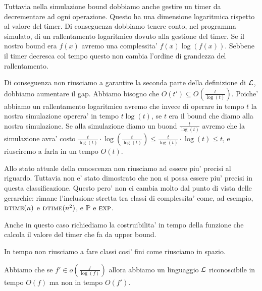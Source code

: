 Tuttavia nella simulazione bound dobbiamo anche gestire un timer da decrementare ad ogni operazione.
Questo ha una dimensione logaritmica rispetto al valore del timer. Di conseguenza dobbiamo tenere
conto, nel programma simulato, di un rallentamento logaritmico dovuto alla gestione del timer. Se il
nostro bound era $f(x)$ avremo una complessita' $f(x)\log(f(x))$. Sebbene il timer decresca col
tempo questo non cambia l'ordine di grandezza del rallentamento.

Di conseguenza non riusciamo a garantire la seconda parte della definizione di $\mathcal{L}$, dobbiamo
aumentare il gap. Abbiamo bisogno che $O(t') \subseteq O(\frac{t}{\log(t)})$. Poiche' abbiamo un
rallentamento logaritmico avremo che invece di operare in tempo $t$ la nostra simulazione operera'
in tempo $t\log(t)$, se $t$ era il bound che diamo alla nostra simulazione. Se alla simulazione
diamo un buond $\frac{t}{\log(t)}$ avremo che la simulazione avra' costo $\frac{t}{\log(t)}\cdot
\log\left(\frac{t}{\log(t)}\right) \leq \frac{t}{\log(t)}\cdot \log(t) \leq t$, e riusciremo a farla in un
tempo $O(t)$.


Allo stato attuale della conoscenza non riusciamo ad essere piu' precisi al riguardo. Tuttavia non
e' stato dimostrato che non si possa essere piu' precisi in questa classificazione. Questo pero'
non ci cambia molto dal punto di vista delle gerarchie: rimane l'inclusione stretta tra classi di
complessita' come, ad esempio, $\textsc{dtime}(n)$ e $\textsc{dtime}(n^{2})$, e $\mathbb{P}$ e $\textsc{exp}$.

Anche in questo caso richiediamo la costruibilita' in tempo della funzione che calcola il valore del
timer che fa da upper bound.

In tempo non riusciamo a fare classi cosi' fini come riusciamo in spazio.

Abbiamo che se $f' \in o(\frac{f}{\log(f)})$ allora abbiamo un linguaggio $\mathcal{L}$ riconoscibile in
tempo $O(f)$ ma non in tempo $O(f')$.

